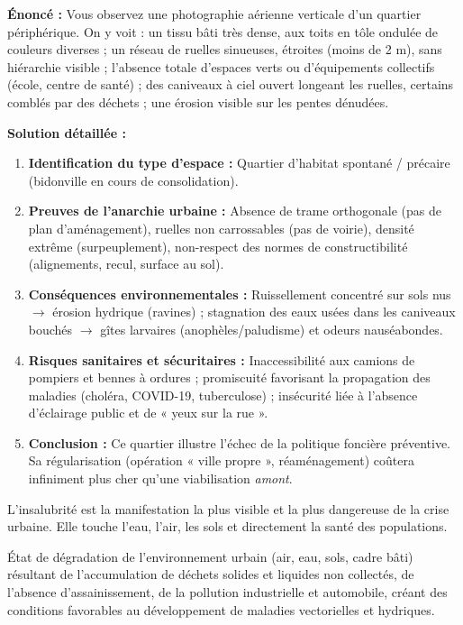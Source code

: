 \documentclass[11pt]{article}
\newcounter{popsec}
\newcounter{popsub}
\newcommand{\courssub}[1]{%
  \stepcounter{popsub}%
  \par\vspace{9pt}\noindent{\popxbold\fontsize{11.5}{13}\selectfont\color{popink}{\color{poporange}\thepopsec.\thepopsub}\hspace{6pt}#1}\par\nopagebreak\vspace{4pt}
}
\begin{document}
\begin{exoresolu}
\textbf{Énoncé :} Vous observez une photographie aérienne verticale d'un quartier périphérique. On y voit : un tissu bâti très dense, aux toits en tôle ondulée de couleurs diverses ; un réseau de ruelles sinueuses, étroites (moins de 2 m), sans hiérarchie visible ; l'absence totale d'espaces verts ou d'équipements collectifs (école, centre de santé) ; des caniveaux à ciel ouvert longeant les ruelles, certains comblés par des déchets ; une érosion visible sur les pentes dénudées.

\textbf{Solution détaillée :}
\begin{enumerate}
    \item \textbf{Identification du type d'espace :} Quartier d'habitat spontané / précaire (bidonville en cours de consolidation).
    \item \textbf{Preuves de l'anarchie urbaine :} Absence de trame orthogonale (pas de plan d'aménagement), ruelles non carrossables (pas de voirie), densité extrême (surpeuplement), non-respect des normes de constructibilité (alignements, recul, surface au sol).
    \item \textbf{Conséquences environnementales :} Ruissellement concentré sur sols nus $\rightarrow$ érosion hydrique (ravines) ; stagnation des eaux usées dans les caniveaux bouchés $\rightarrow$ gîtes larvaires (anophèles/paludisme) et odeurs nauséabondes.
    \item \textbf{Risques sanitaires et sécuritaires :} Inaccessibilité aux camions de pompiers et bennes à ordures ; promiscuité favorisant la propagation des maladies (choléra, COVID-19, tuberculose) ; insécurité liée à l'absence d'éclairage public et de « yeux sur la rue ».
    \item \textbf{Conclusion :} Ce quartier illustre l'échec de la politique foncière préventive. Sa régularisation (opération « ville propre », réaménagement) coûtera infiniment plus cher qu'une viabilisation \emph{amont}.
\end{enumerate}
\end{exoresolu}

\courssub{L'insalubrité : un défi sanitaire majeur}

L'insalubrité est la manifestation la plus visible et la plus dangereuse de la crise urbaine. Elle touche l'eau, l'air, les sols et directement la santé des populations.

\begin{definition}
État de dégradation de l'environnement urbain (air, eau, sols, cadre bâti) résultant de l'accumulation de déchets solides et liquides non collectés, de l'absence d'assainissement, de la pollution industrielle et automobile, créant des conditions favorables au développement de maladies vectorielles et hydriques.
\end{definition}
\end{document}
